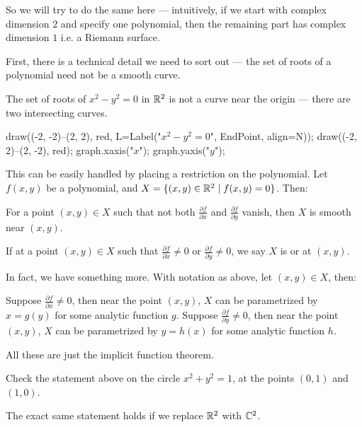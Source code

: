 So we will try to do the same here --- intuitively, if we start with complex dimension $2$ and
specify one polynomial, then the remaining part has complex dimension $1$ i.e. a Riemann surface.

First, there is a technical detail we need to sort out ---
the set of roots of a polynomial need not be a smooth curve.
\begin{example}
	The set of roots of $x^2-y^2 = 0$ in $\mathbb R^2$ is not a curve near the origin --- there are two
	intersecting curves.
	\begin{center}
		\begin{asy}
			draw((-2, -2)--(2, 2), red, L=Label("$x^2-y^2=0$", EndPoint, align=N));
			draw((-2, 2)--(2, -2), red);
			graph.xaxis("$x$");
			graph.yaxis("$y$");
		\end{asy}
	\end{center}
\end{example}

This can be easily handled by placing a restriction on the polynomial.
Let $f(x, y)$ be a polynomial, and $X = \{(x, y) \in \mathbb R^2 \mid f(x, y) = 0 \}$. Then:
\begin{theorem}
	For a point $(x, y) \in X$ such that not both
	$\frac{\partial f}{\partial x}$ and $\frac{\partial f}{\partial y}$ vanish, then $X$
	is smooth near $(x, y)$.
\end{theorem}

If at a point $(x, y) \in X$ such that
$\frac{\partial f}{\partial x} \neq 0$ or $\frac{\partial f}{\partial y} \neq 0$,
we say $X$ is  or  at $(x, y)$.

In fact, we have something more. With notation as above, let $(x, y) \in X$, then:
\begin{itemize}
	\ii Suppose $\frac{\partial f}{\partial x} \neq 0$, then near the point $(x, y)$, $X$ can be
	parametrized by $x = g(y)$ for some analytic function $g$.
	\ii Suppose $\frac{\partial f}{\partial y} \neq 0$, then near the point $(x, y)$, $X$ can be
	parametrized by $y = h(x)$ for some analytic function $h$.
\end{itemize}
All these are just the implicit function theorem.

\begin{exercise}
	Check the statement above on the circle $x^2 + y^2 = 1$, at the points $(0, 1)$ and $(1, 0)$.
\end{exercise}

The exact same statement holds if we replace $\mathbb R^2$ with $\mathbb C^2$.

